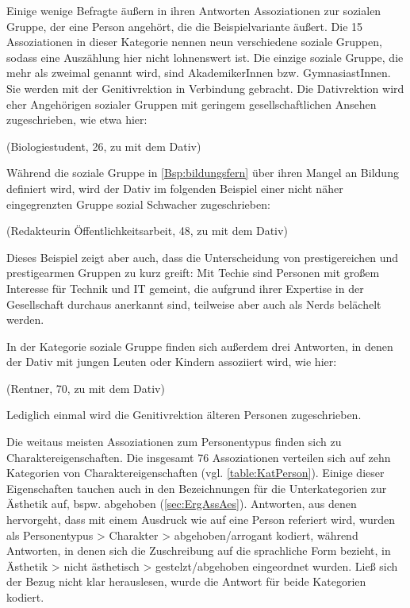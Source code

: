 Einige wenige Befragte äußern in ihren Antworten Assoziationen zur sozialen Gruppe, der eine Person angehört, die die Beispielvariante äußert. 
Die 15 Assoziationen in dieser Kategorie nennen neun verschiedene soziale Gruppen, sodass eine Auszählung hier nicht lohnenswert ist. 
Die einzige soziale Gruppe, die mehr als zweimal genannt wird, sind AkademikerInnen bzw. GymnasiastInnen.
Sie werden mit der Genitivrektion in Verbindung gebracht.
Die Dativrektion wird eher Angehörigen sozialer Gruppen mit geringem gesellschaftlichen Ansehen zugeschrieben, wie etwa hier: 
\begin{exe}
\ex {} (Biologiestudent, 26, zu \waehrend{} mit dem Dativ) \label{Bsp:bildungsfern}
\end{exe}
Während die soziale Gruppe in \autoref{Bsp:bildungsfern} über ihren Mangel an Bildung definiert wird, wird der Dativ im folgenden Beispiel einer nicht näher eingegrenzten Gruppe \glqq sozial Schwacher\grqq{} zugeschrieben: 
\begin{exe}
\ex {} (Redakteurin Öffentlichkeitsarbeit, 48, zu \waehrend{} mit dem Dativ)
\end{exe}
Dieses Beispiel zeigt aber auch, dass die Unterscheidung von prestigereichen und prestigearmen Gruppen zu kurz greift: 
Mit \glqq Techie\grqq{} sind Personen mit großem Interesse für Technik und IT gemeint, die aufgrund ihrer Expertise in der Gesellschaft durchaus anerkannt sind, teilweise aber auch als \glqq Nerds\grqq{} belächelt werden. 

In der Kategorie \glqq soziale Gruppe\grqq{} finden sich außerdem drei Antworten, in denen der Dativ mit jungen Leuten oder Kindern assoziiert wird, wie hier: 
\begin{exe}
\ex {} (Rentner, 70, zu \waehrend{} mit dem Dativ)
\end{exe}
Lediglich einmal wird die Genitivrektion älteren Personen zugeschrieben. 

Die weitaus meisten Assoziationen zum Personentypus finden sich zu Charaktereigenschaften.
Die insgesamt 76 Assoziationen verteilen sich auf zehn Kategorien von Charaktereigenschaften (vgl. \autoref{table:KatPerson}). 
Einige dieser Eigenschaften tauchen auch in den Bezeichnungen für die Unterkategorien zur Ästhetik auf, bspw. abgehoben (\autoref{sec:ErgAssAes}). 
Antworten, aus denen hervorgeht, dass mit einem Ausdruck wie  auf eine Person referiert wird, wurden als \glqq Personentypus > Charakter > abgehoben/arrogant\grqq{} kodiert, während Antworten, in denen sich die Zuschreibung auf die sprachliche Form bezieht, in \glqq Ästhetik > nicht ästhetisch > gestelzt/abgehoben\grqq{} eingeordnet wurden. 
Ließ sich der Bezug nicht klar herauslesen, wurde die Antwort für beide Kategorien kodiert. 


